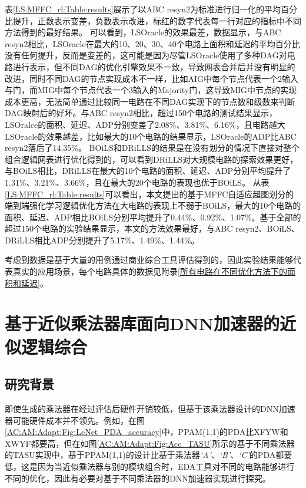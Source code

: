 表\ref{LS:MFFC_rl:Table:results}展示了以ABC resyn2为标准进行归一化的平均百分比提升，正数表示变差，负数表示改进，标红的数字代表每一行对应的指标中不同方法得到的最好结果。
可以看到，LSOracle\cite{LS:LSOracle}的效果最差，数据显示，与ABC resyn2相比，LSOracle在最大的10、20、30、40个电路上面积和延迟的平均百分比没有任何提升，反而是变差的，这可能是因为尽管LSOracle使用了多种DAG对电路进行表示，但不同DAG的优化引擎效果不一致，导致网表合并后并没有明显的改进，同时不同DAG的节点实现成本不一样，比如AIG中每个节点代表一个2输入与门，而MIG中每个节点代表一个3输入的Majority门，这导致MIG中节点的实现成本更高，无法简单通过比较同一电路在不同DAG实现下的节点数和级数来判断DAG映射后的好坏。与ABC resyn2相比，超过150个电路的测试结果显示，LSOralce的面积、延迟、ADP分别变差了2.08\%、3.81\%、6.16\%，且电路越大LSOracle的效果越差，比如最大的10个电路的结果显示，LSOracle的ADP比ABC resyn2落后了14.35\%。
BOiLS和DRiLLS的结果是在没有划分的情况下直接对整个组合逻辑网表进行优化得到的，可以看到DRiLLS对大规模电路的探索效果更好，与BOiLS相比，DRiLLS在最大的10个电路的面积、延迟、ADP分别平均提升了1.31\%、3.21\%、3.66\%，且在最大的20个电路的表现也优于BOiLS。
从表\ref{LS:MFFC_rl:Table:results}可以看出，本文提出的基于MFFC自适应超图划分的端到端强化学习逻辑优化方法在大电路的表现上不弱于BOiLS，最大的10个电路的面积、延迟、ADP相比BOiLS分别平均提升了0.44\%、0.92\%、1.07\%。基于全部的超过150个电路的实验结果显示，本文的方法效果最好，与ABC resyn2、BOiLS、DRiLLS相比ADP分别提升了5.17\%、1.49\%、1.44\%。

考虑到数据是基于大量的用例通过商业综合工具评估得到的，因此实验结果能够代表真实的应用场景，每个电路具体的数据见附录\ref{所有电路在不同优化方法下的面积和延迟}。


\section{基于近似乘法器库面向DNN加速器的近似逻辑综合}

\subsection{研究背景}

即使生成的乘法器在经过评估后硬件开销较低，但基于该乘法器设计的DNN加速器可能硬件成本并不领先。例如，在图\ref{AC:AM:Adapt:Fig:LeNet_PDA_accuracy}中，PPAM(1,1)的PDA比XFYW和XWYF都要高，但在如图\ref{AC:AM:Adapt:Fig:Acc_TASU}所示的基于不同乘法器的TASU\cite{Accelerator:JiaoLi}实现中，基于PPAM(1,1)的设计比基于乘法器\emph{`A'}、\emph{`B'}、\emph{`C'}的PDA都要低，这是因为当近似乘法器与别的模块组合时，EDA工具对不同的电路能够进行不同的优化，因此有必要对基于不同乘法器的DNN加速器实现进行探究。

